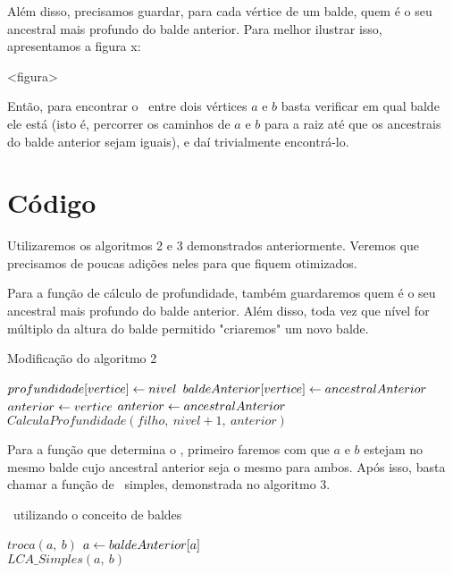 Além disso, precisamos guardar, para cada vértice de um balde, quem é o seu ancestral mais profundo do balde anterior. Para melhor ilustrar isso, apresentamos a figura x:

<figura>

Então, para encontrar o \LCA\ entre dois vértices $a$ e $b$ basta verificar em qual balde ele está (isto é, percorrer os caminhos de $a$ e $b$ para a raiz até que os ancestrais do balde anterior sejam iguais), e daí trivialmente encontrá-lo.

\section{Código}

Utilizaremos os algoritmos 2 e 3 demonstrados anteriormente. Veremos que precisamos de poucas adições neles para que fiquem otimizados.

\hspace{1cm}

Para a função de cálculo de profundidade, também guardaremos quem é o seu ancestral mais profundo do balde anterior. Além disso, toda vez que nível for múltiplo da altura do balde permitido "criaremos" um novo balde.

\begin{algorithm}[H]
\caption{Modificação do algoritmo 2}
\begin{algorithmic}[1]
    \State $profundidade[vertice] \leftarrow nivel$
    \State $baldeAnterior[vertice] \leftarrow ancestralAnterior$
        \State $anterior \leftarrow vertice$
    \Else
        \State $anterior \leftarrow ancestralAnterior$
    \EndIf
        \State $CalculaProfundidade(filho,\ nivel+1,\ anterior)$
    \EndFor
\EndFunction
\end{algorithmic}
\end{algorithm}

Para a função que determina o \LCA, primeiro faremos com que $a$ e $b$ estejam no mesmo balde cujo ancestral anterior seja o mesmo para ambos. Após isso, basta chamar a função de \LCA\ simples, demonstrada no algoritmo 3.

\begin{algorithm}[H]
\caption{\LCA\ utilizando o conceito de baldes}
\begin{algorithmic}[1]
            \State $troca(a,\ b)$
        \State $a \leftarrow baldeAnterior[a]$
        \EndIf
    \EndWhile
    \\\hspace{5mm} \Return $LCA\_Simples(a,\ b)$
\EndFunction
\end{algorithmic}
\end{algorithm}

